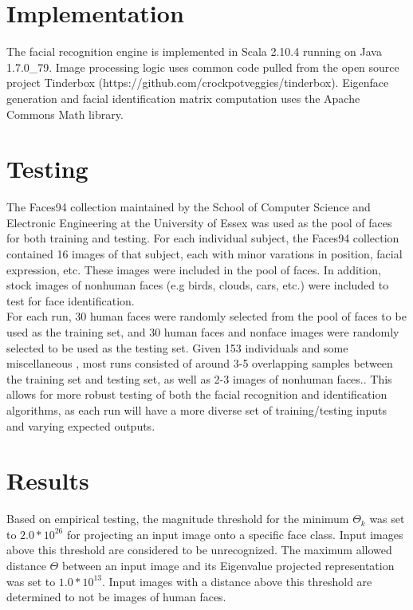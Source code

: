 \documentclass[11pt]{article}
\begin{document}
\section*{Implementation}
The facial recognition engine is implemented in Scala 2.10.4 running on Java 1.7.0\_79. Image processing logic uses common code pulled from the open source project Tinderbox (https://github.com/crockpotveggies/tinderbox). Eigenface generation and facial identification matrix computation uses the Apache Commons Math library.

\section*{Testing}
The Faces94 collection maintained by the School of Computer Science and Electronic Engineering at the University of Essex was used as the pool of faces for both training and testing. For each individual subject, the Faces94 collection contained 16 images of that subject, each with minor varations in position, facial expression, etc. These images were included in the pool of faces. In addition, stock images of nonhuman faces (e.g birds, clouds, cars, etc.) were included to test for face identification.\\

\noindent
For each run, 30 human faces were randomly selected from the pool of faces to be used as the training set, and 30 human faces and nonface images were randomly selected to be used as the testing set. Given 153 individuals and some miscellaneous , most runs consisted of around 3-5 overlapping samples between the training set and testing set, as well as 2-3 images of nonhuman faces.. This allows for more robust testing of both the facial recognition and identification algorithms, as each run will have a more diverse set of training/testing inputs and varying expected outputs.

\section*{Results}
Based on empirical testing, the magnitude threshold for the minimum $\Theta_k$ was set to $2.0*10^{26}$ for projecting an input image onto a specific face class. Input images above this threshold are considered to be unrecognized. The maximum allowed distance $\Theta$ between an input image and its Eigenvalue projected representation was set to $1.0*10^{13}$. Input images with a distance above this threshold are determined to not be images of human faces.\\
\end{document}
